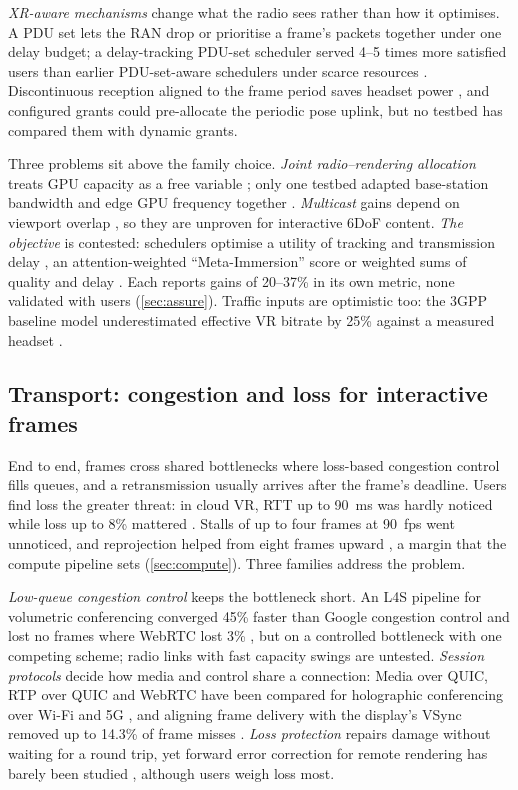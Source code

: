 \emph{XR-aware mechanisms} change what the radio sees rather than how it optimises. A PDU set lets the
RAN drop or prioritise a frame's packets together under one delay budget; a delay-tracking PDU-set
scheduler served 4--5 times more satisfied users than earlier PDU-set-aware schedulers under scarce
resources \cite{W7168254691}. Discontinuous reception aligned to the frame period saves headset power
\cite{W3209239392}, and configured grants could pre-allocate the periodic pose uplink, but no testbed
has compared them with dynamic grants.

Three problems sit above the family choice. \emph{Joint radio--rendering allocation} treats GPU capacity
as a free variable \cite{W4379382423}; only one testbed adapted base-station bandwidth and edge GPU
frequency together \cite{W4413321019}. \emph{Multicast} gains depend on viewport overlap
\cite{W2901851646}, so they are unproven for interactive 6DoF content. \emph{The objective} is
contested: schedulers optimise a utility of tracking and transmission delay \cite{W2596760110}, an
attention-weighted ``Meta-Immersion'' score \cite{W4379382423} or weighted sums of quality and delay
\cite{W4312555471}. Each reports gains of 20--37\% in its own metric, none validated with users
(\cref{sec:assure}). Traffic inputs are optimistic too: the 3GPP baseline model underestimated
effective VR bitrate by 25\% against a measured headset \cite{W4399340506}.

\subsection{Transport: congestion and loss for interactive frames}
End to end, frames cross shared bottlenecks where loss-based congestion control fills queues, and a
retransmission usually arrives after the frame's deadline. Users find loss the greater threat: in cloud
VR, RTT up to 90~ms was hardly noticed while loss up to 8\% mattered \cite{W3095344018}. Stalls of up
to four frames at 90~fps went unnoticed, and reprojection helped from eight frames upward
\cite{W4301184864}, a margin that the compute pipeline sets (\cref{sec:compute}). Three families
address the problem.

\emph{Low-queue congestion control} keeps the bottleneck short. An L4S pipeline for volumetric
conferencing converged 45\% faster than Google congestion control and lost no frames where WebRTC lost
3\% \cite{W4408870658}, but on a controlled bottleneck with one competing scheme; radio links with fast
capacity swings are untested. \emph{Session protocols} decide how media and control share a connection:
Media over QUIC, RTP over QUIC and WebRTC have been compared for holographic conferencing over Wi-Fi and
5G \cite{W4416047836}, and aligning frame delivery with the display's VSync removed up to 14.3\% of
frame misses \cite{W2838572662}. \emph{Loss protection} repairs damage without waiting for a round
trip, yet forward error correction for remote rendering has barely been studied \cite{W4409129991},
although users weigh loss most.

